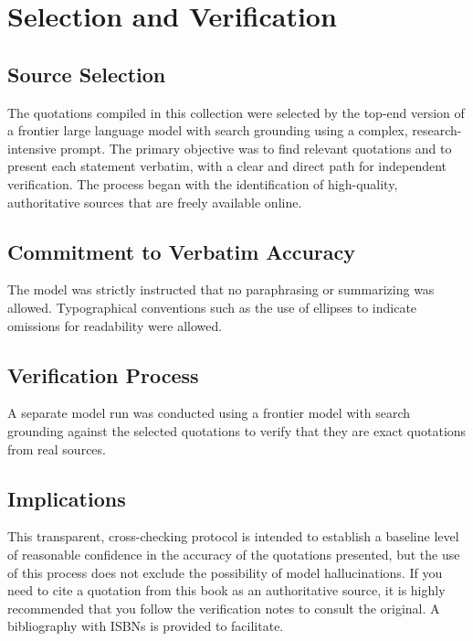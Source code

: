 \chapter{Selection and Verification}

\section{Source Selection}

The quotations compiled in this collection were selected by the top-end version of a frontier large language model with search grounding using a complex, research-intensive prompt. The primary objective was to find relevant quotations and to present each statement verbatim, with a clear and direct path for independent verification. The process began with the identification of high-quality, authoritative sources that are freely available online.

\section{Commitment to Verbatim Accuracy}

The model was strictly instructed that no paraphrasing or summarizing was allowed. Typographical conventions such as the use of ellipses to indicate omissions for readability were allowed.

\section{Verification Process}

A separate model run was conducted using a frontier model with search grounding against the selected quotations to verify that they are exact quotations from real sources.

\section{Implications}
This transparent, cross-checking protocol is intended to establish a baseline level of reasonable confidence in the accuracy of the quotations presented, but the use of this process does not exclude the possibility of model hallucinations. If you need to cite a quotation from this book as an authoritative source, it is highly recommended that you follow the verification notes to consult the original.  A bibliography with ISBNs is provided to facilitate.
